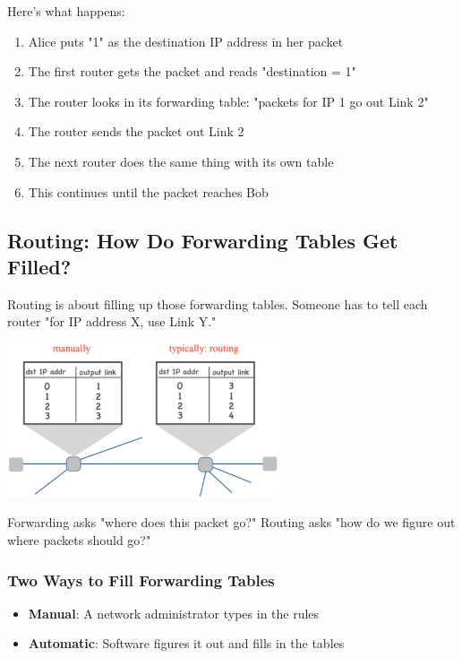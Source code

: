 \documentclass[../../compsys.tex]{subfiles}
\begin{document}
Here's what happens:
\begin{enumerate}
    \item Alice puts "1" as the destination IP address in her packet
    \item The first router gets the packet and reads "destination = 1"
    \item The router looks in its forwarding table: "packets for IP 1 go out Link 2"
    \item The router sends the packet out Link 2
    \item The next router does the same thing with its own table
    \item This continues until the packet reaches Bob
\end{enumerate}
\newpage

\subsection{Routing: How Do Forwarding Tables Get Filled?}
Routing is about filling up those forwarding tables. Someone has to tell each router "for IP address X, use Link Y."

\begin{center}
    \includegraphics[width=0.6\textwidth]{images/manually-vs-routing.png}
\end{center}

Forwarding asks "where does this packet go?" Routing asks "how do we figure out where packets should go?"

\subsubsection{Two Ways to Fill Forwarding Tables}
\begin{itemize}
    \item \textbf{Manual}: A network administrator types in the rules
    \item \textbf{Automatic}: Software figures it out and fills in the tables
\end{itemize}
\end{document}
